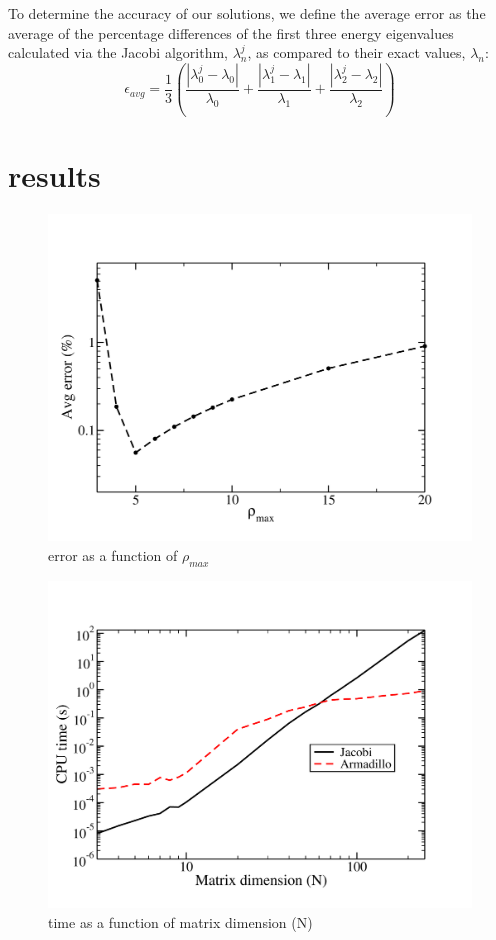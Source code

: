 \documentclass[prc,amsmath,twocolumn,superscriptaddress]{revtex4}
\begin{document}
To determine the accuracy of our solutions, we define the average error as the average of the percentage differences of the first three energy eigenvalues calculated via the Jacobi algorithm, $\lambda_n^j$, as compared to their exact values, $\lambda_n$:
\begin{equation}
\epsilon_{avg}=\frac{1}{3}\left(\frac{|\lambda_0^{j}-\lambda_0|}{\lambda_0}
+\frac{|\lambda_1^{j}-\lambda_1|}{\lambda_1} +\frac{|\lambda_2^{j}-\lambda_2|}{\lambda_2} \right)
\end{equation}

\section{results}
\label{results}

\begin{figure}[h]
\includegraphics[scale=0.33]{error_pmax.pdf}
\caption{error as a function of $\rho_{max}$}
\label{algorithm}
\end{figure}

\begin{figure}[h]
\includegraphics[scale=0.33]{N_time2.pdf}
\caption{time as a function of matrix dimension (N)}
\label{algorithm}
\end{figure}
\end{document}

